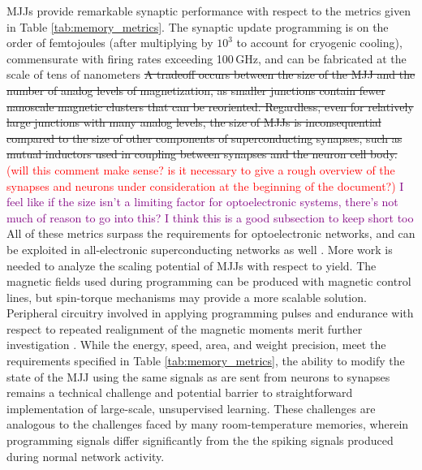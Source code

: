 \documentclass[twocolumn]{article}
\begin{document}
MJJs provide remarkable synaptic performance with respect to the metrics given in Table \ref{tab:memory_metrics}. The synaptic update programming is on the order of femtojoules (after multiplying by $10^3$ to account for cryogenic cooling), commensurate with firing rates exceeding 100\,GHz, and can be fabricated at the scale of tens of nanometers \sout{A tradeoff occurs between the size of the MJJ and the number of analog levels of magnetization, as smaller junctions contain fewer nanoscale magnetic clusters that can be reoriented. Regardless, even for relatively large junctions with many analog levels, the size of  MJJs is inconsequential compared to the size of other components of superconducting synapses, such as mutual inductors used in coupling between synapses and the neuron cell body.} \textcolor{red}{(will this comment make sense? is it necessary to give a rough overview of the synapses and neurons under consideration at the beginning of the document?)} \textcolor{purple}{I feel like if the size isn't a limiting factor for optoelectronic systems, there's not much of reason to go into this? I think this is a good subsection to keep short too} All of these metrics surpass the requirements for optoelectronic networks, and can be exploited in all-electronic superconducting networks as well \cite{schneider2018tutorial}. More work is needed to analyze the scaling potential of MJJs with respect to yield. The magnetic fields used during programming can be produced with magnetic control lines, but spin-torque mechanisms may provide a more scalable solution. Peripheral circuitry involved in applying programming pulses and endurance with respect to repeated realignment of the magnetic moments merit further investigation \cite{schneider2018ultralow}. While the energy, speed, area, and weight precision, meet the requirements specified in Table \ref{tab:memory_metrics}, the ability to modify the state of the MJJ using the same signals as are sent from neurons to synapses remains a technical challenge and potential barrier to straightforward implementation of large-scale, unsupervised learning. These challenges are analogous to the challenges faced by many room-temperature memories, wherein programming signals differ significantly from the the spiking signals produced during normal network activity.
\end{document}
